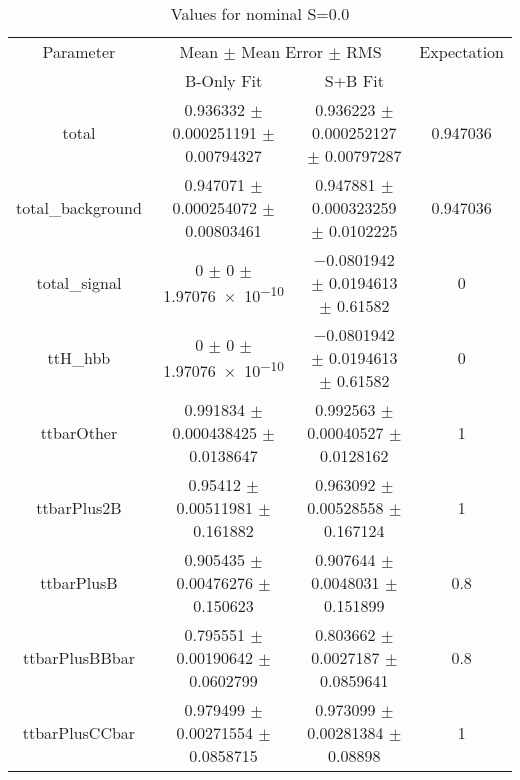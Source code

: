\begin{table}
\centering
\caption{Values for nominal S=0.0}
\begin{tabular}{cccc}
\toprule
Parameter & \multicolumn{2}{c}{Mean $\pm$ Mean Error $\pm$ RMS} & Expectation\\
 & B-Only Fit & S+B Fit & \\
\midrule
total & \num{0.936332} $\pm$ \num{0.000251191} $\pm$ \num{0.00794327} & \num{0.936223} $\pm$ \num{0.000252127} $\pm$ \num{0.00797287} & \num{0.947036}\\
total\_background & \num{0.947071} $\pm$ \num{0.000254072} $\pm$ \num{0.00803461} & \num{0.947881} $\pm$ \num{0.000323259} $\pm$ \num{0.0102225} & \num{0.947036}\\
total\_signal & \num{0} $\pm$ \num{0} $\pm$ \num{1.97076e-10} & \num{-0.0801942} $\pm$ \num{0.0194613} $\pm$ \num{0.61582} & \num{0}\\
ttH\_hbb & \num{0} $\pm$ \num{0} $\pm$ \num{1.97076e-10} & \num{-0.0801942} $\pm$ \num{0.0194613} $\pm$ \num{0.61582} & \num{0}\\
ttbarOther & \num{0.991834} $\pm$ \num{0.000438425} $\pm$ \num{0.0138647} & \num{0.992563} $\pm$ \num{0.00040527} $\pm$ \num{0.0128162} & \num{1}\\
ttbarPlus2B & \num{0.95412} $\pm$ \num{0.00511981} $\pm$ \num{0.161882} & \num{0.963092} $\pm$ \num{0.00528558} $\pm$ \num{0.167124} & \num{1}\\
ttbarPlusB & \num{0.905435} $\pm$ \num{0.00476276} $\pm$ \num{0.150623} & \num{0.907644} $\pm$ \num{0.0048031} $\pm$ \num{0.151899} & \num{0.8}\\
ttbarPlusBBbar & \num{0.795551} $\pm$ \num{0.00190642} $\pm$ \num{0.0602799} & \num{0.803662} $\pm$ \num{0.0027187} $\pm$ \num{0.0859641} & \num{0.8}\\
ttbarPlusCCbar & \num{0.979499} $\pm$ \num{0.00271554} $\pm$ \num{0.0858715} & \num{0.973099} $\pm$ \num{0.00281384} $\pm$ \num{0.08898} & \num{1}\\
\bottomrule
\end{tabular}
\end{table}